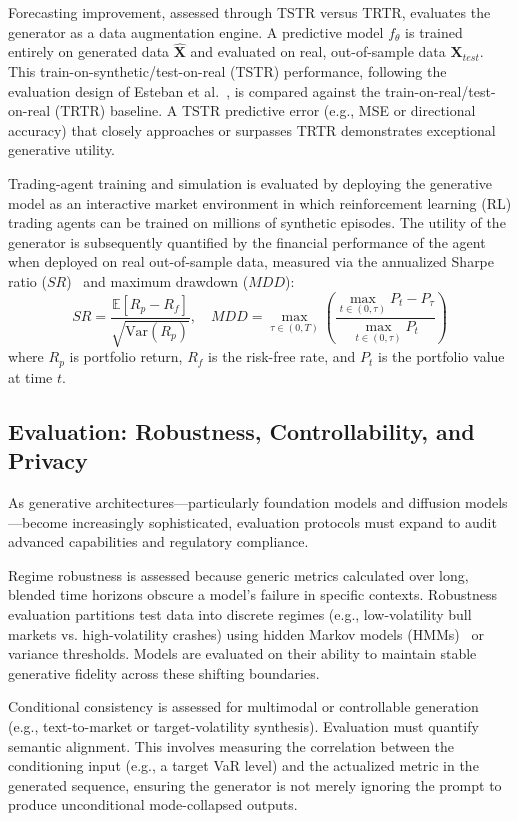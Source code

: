 \documentclass[11pt,a4paper]{article}
\begin{document}
Forecasting improvement, assessed through TSTR versus TRTR, evaluates the generator as a data augmentation engine. A predictive model $f_\theta$ is trained entirely on generated data $\hat{\mathbf{X}}$ and evaluated on real, out-of-sample data $\mathbf{X}_{test}$. This train-on-synthetic/test-on-real (TSTR) performance, following the evaluation design of Esteban et al.~\citep{esteban2017real}, is compared against the train-on-real/test-on-real (TRTR) baseline. A TSTR predictive error (e.g., MSE or directional accuracy) that closely approaches or surpasses TRTR demonstrates exceptional generative utility.

Trading-agent training and simulation is evaluated by deploying the generative model as an interactive market environment in which reinforcement learning (RL) trading agents can be trained on millions of synthetic episodes. The utility of the generator is subsequently quantified by the financial performance of the agent when deployed on real out-of-sample data, measured via the annualized Sharpe ratio ($SR$)~\citep{sharpe1994sharpe} and maximum drawdown ($MDD$):
    \begin{equation}
        SR = \frac{\mathbb{E}[R_p - R_f]}{\sqrt{\text{Var}(R_p)}}, \quad MDD = \max_{\tau \in (0, T)} \left( \frac{\max_{t \in (0, \tau)} P_t - P_\tau}{\max_{t \in (0, \tau)} P_t} \right)
    \end{equation}
    where $R_p$ is portfolio return, $R_f$ is the risk-free rate, and $P_t$ is the portfolio value at time $t$.

\subsection{Evaluation: Robustness, Controllability, and Privacy}
As generative architectures—particularly foundation models and diffusion models—become increasingly sophisticated, evaluation protocols must expand to audit advanced capabilities and regulatory compliance.

Regime robustness is assessed because generic metrics calculated over long, blended time horizons obscure a model's failure in specific contexts. Robustness evaluation partitions test data into discrete regimes (e.g., low-volatility bull markets vs. high-volatility crashes) using hidden Markov models (HMMs)~\citep{rabiner1989tutorial,hamilton1989new} or variance thresholds. Models are evaluated on their ability to maintain stable generative fidelity across these shifting boundaries.

Conditional consistency is assessed for multimodal or controllable generation (e.g., text-to-market or target-volatility synthesis). Evaluation must quantify semantic alignment. This involves measuring the correlation between the conditioning input (e.g., a target VaR level) and the actualized metric in the generated sequence, ensuring the generator is not merely ignoring the prompt to produce unconditional mode-collapsed outputs.
\end{document}
